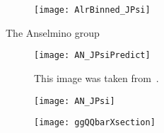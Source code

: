 \begin{figure}[h!t]
  \centering \texttt{[image: AlrBinned\_JPsi]}
  \caption{}
  \label{fig::AlrBinned_JPsi}
\end{figure}

The Anselmino group 
\begin{figure}[h!t]
  \centering \texttt{[image: AN\_JPsiPredict]}
  \caption{This image was taken from~\cite{Anselmino:2016fhz}.}
  \label{fig::AN_JPsiPredict}
\end{figure}

\begin{figure}[h!t]
  \centering
  \texttt{[image: AN\_JPsi]}
  \caption{}
  \label{fig::AN_JPsi}
\end{figure}

\begin{figure}[h!t]
  \centering
  \texttt{[image: ggQQbarXsection]}
  \caption{}
  \label{fig::ggQQbarXsection}
\end{figure}



